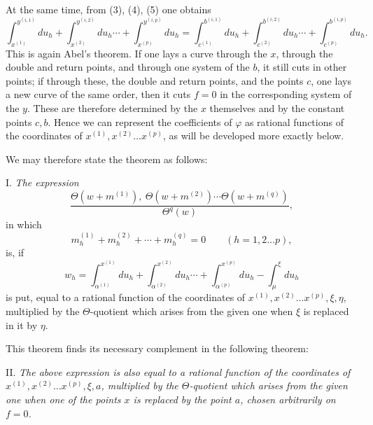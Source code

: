 \documentclass[10pt]{article}
\begin{document}
At the same time, from (3), (4), (5) one obtains
\[
\int_{x^{(1)}}^{y^{(i,1)}}du_h+\int_{x^{(2)}}^{y^{(i,2)}}du_h\cdots+
\int_{x^{(p)}}^{y^{(i,p)}}du_h
=
\int_{c^{(1)}}^{b^{(i,1)}}du_h+\int_{c^{(2)}}^{b^{(i,2)}}du_h\cdots+
\int_{c^{(p)}}^{b^{(i,p)}}du_h.
\]
This is again Abel's theorem. If one lays a curve through the \(x\), through the double and return points, and through one system of the \(b\), it still cuts in other points; if through these, the double and return points, and the points \(c\), one lays a new curve of the same order, then it cuts \(f=0\) in the corresponding system of the \(y\). These are therefore determined by the \(x\) themselves and by the constant points \(c,b\). Hence we can represent the coefficients of \(\varphi\) as rational functions of the coordinates of \(x^{(1)},x^{(2)}\ldots x^{(p)}\), as will be developed more exactly below.

We may therefore state the theorem as follows:

\medskip
\noindent I. \emph{The expression}
\[
\frac{\Theta(w+m^{(1)}),\ \Theta(w+m^{(2)})\cdots\Theta(w+m^{(q)})}{\Theta^{q}(w)},
\]
in which
\[
m_h^{(1)}+m_h^{(2)}+\cdots+m_h^{(q)}=0\qquad(h=1,2\ldots p),
\]
is, if
\[
w_h=\int_{\alpha^{(1)}}^{x^{(1)}}du_h+
\int_{\alpha^{(2)}}^{x^{(2)}}du_h\cdots+
\int_{\alpha^{(p)}}^{x^{(p)}}du_h-
\int_{\mu}^{\xi}du_h
\]
is put, equal to a rational function of the coordinates of \(x^{(1)},x^{(2)}\ldots x^{(p)},\xi,\eta\), multiplied by the \(\Theta\)-quotient which arises from the given one when \(\xi\) is replaced in it by \(\eta\).

This theorem finds its necessary complement in the following theorem:

\medskip
\noindent II. \emph{The above expression is also equal to a rational function of the coordinates of \(x^{(1)},x^{(2)}\ldots x^{(p)},\xi,a\), multiplied by the \(\Theta\)-quotient which arises from the given one when one of the points \(x\) is replaced by the point \(a\), chosen arbitrarily on \(f=0\).}
\end{document}
